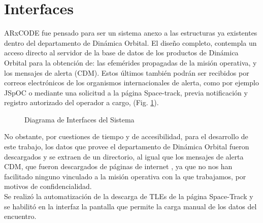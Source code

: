 \section{Interfaces}
ARxCODE fue pensado para ser un sistema anexo a las estructuras ya existentes dentro del departamento de Din\'amica Orbital.
El dise\~no completo, contempla un acceso directo al servidor de la base de datos de los productos de Din\'amica Orbital para la obtenci\'on de: las efem\'erides propagadas de la misi\'on operativa, y los mensajes de alerta (CDM). Estos \'ultimos tambi\'en podr\'an ser recibidos por correos electr\'onicos de los organismos internacionales de alerta, como por ejemplo JSpOC o mediante una solicitud a la p\'agina Space-track, previa notificaci\'on y registro autorizado del operador a cargo, (Fig. \ref{fig:interfaces}).\\

\begin{figure}
\centering
  \caption[Diagrama de Interfaces del Sistema]{Diagrama de Interfaces del Sistema}
  \label{fig:interfaces}
\end{figure}

No obstante, por cuestiones de tiempo y de accesibilidad, para el desarrollo de este trabajo, los datos que provee el departamento de Din\'amica Orbital fueron descargados y se extraen de un directorio, al igual que los mensajes de alerta CDM, que fueron descargados de p\'aginas de internet , ya que no nos han facilitado ninguno vinculado a la misi\'on operativa con la que trabajamos, por motivos de confidencialidad.\\

Se realiz\'o la automatizaci\'on de la descarga de TLEs de la p\'agina Space-Track y se habilit\'o en la interfaz la pantalla que permite la carga manual de los datos del encuentro.\\

